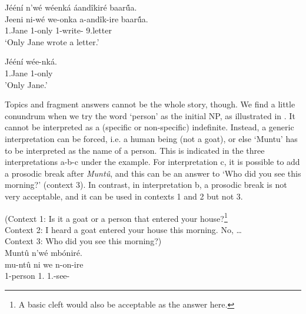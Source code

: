 \documentclass[output=paper]{langscibook}
\begin{document}
\ex
\label{bkm:Ref116899515}
Jééní  n'wé  wéenká  áandîkiré  baar\'{û}a.\\
{
\gll
Jeeni   ni-wé  we-onka a-andîk-ire    baar\'{û}a.\\
1.Jane \PRO{} 1-only  1\SM{}-write-\PFV{} 9.letter\\
}
\glt
‘Only Jane wrote a letter.’

\ex
\label{bkm:Ref116899546}
\gll
Jééní  wée-nká.\\
1.Jane  1-only\\
\glt
'Only Jane.'\\
\z\z



Topics and fragment answers cannot be the whole story, though. We find a little conundrum when we try the word ‘person’ as the initial NP, as illustrated in . It cannot be interpreted as a (specific or non-specific) indefinite. Instead, a generic interpretation can be forced, i.e. a human being (not a goat), or else ‘Muntu’ has to be interpreted as the name of a person. This is indicated in the three interpretations a-b-c under the example. For interpretation c, it is possible to add a prosodic break after \textit{Muntû}, and this can be an answer to ‘Who did you see this morning?’ (context 3). In contrast, in interpretation b, a prosodic break is not very acceptable, and it can be used in contexts 1 and 2 but not 3.

\ea
\label{bkm:Ref116899601}
(Context 1: Is it a goat or a person that entered your house?\footnote{A basic cleft would also be acceptable as the answer here.}\\Context 2: I heard a goat entered your house this morning. No, …\\Context 3: Who did you see this morning?)\\
Muntû  n’wé  mbóniré.\\
\gll mu-ntû  ni we  n-on-ire\\
1-person \FOC{}  1.\PRO{}  1\SG.\SM{}-see-\PFV{}\\
\glt 

\z
\z
\end{document}
